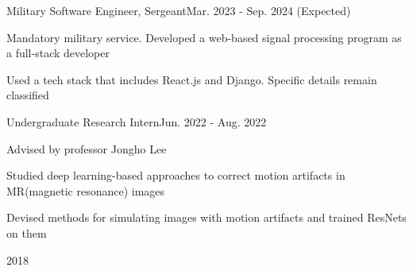 \documentclass{cv}
\begin{document}
{Military Software Engineer, Sergeant}{Mar. 2023 - Sep. 2024 (Expected)}
{
    \item Mandatory military service. Developed a web-based signal processing program as a full-stack developer
    \item Used a tech stack that includes React.js and Django. Specific details remain classified
}
{Undergraduate Research Intern}{Jun. 2022 - Aug. 2022}
{
    \item Advised by professor Jongho Lee
    \item Studied deep learning-based approaches to correct motion artifacts in MR(magnetic resonance) images
    \item Devised methods for simulating images with motion artifacts and trained ResNets on them
}
\begin{comment}
\cventry{Research \& Education Program (R\&E)}{Korea Science Academy}
{Title: On Wave Propagation in Hyperhelix Structures}{Mar. 2019 - Dec. 2019}
{
    \item Advised by Dr. Yongdeok Kim
    \item Implemented a mechanical wave simulator for curved waveguide using python %
    \item Gave a poster presentation at International Science Youth Forum (ISYF) @ Singapore 2020
}
\end{comment}
 {2018}


\vspace{-4mm}
\vspace{2mm}
\end{document}
